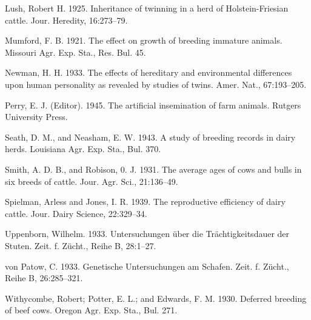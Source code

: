 \begin{hangparas}{0.5in}{1}
Lush, Robert H. 1925. Inheritance of twinning in a herd of Holstein-Friesian cattle.
Jour. Heredity, 16:273--79.

Mumford, F. B. 1921. The effect on growth of breeding immature animals. Missouri
Agr. Exp. Sta., Res. Bul. 45.

Newman, H. H. 1933. The effects of hereditary and environmental differences upon
human personality as revealed by studies of twins. Amer. Nat., 67:193--205.

Perry, E. J. (Editor). 1945. The artificial insemination of farm animals. Rutgers
University Press.

Seath, D. M., and Neasham, E. W. 1943. A study of breeding records in dairy herds.
Louisiana Agr. Exp. Sta., Bul. 370.

Smith, A. D. B., and Robison, 0. J. 1931. The average ages of cows and bulls in
six breeds of cattle. Jour. Agr. Sci., 21:136--49.

Spielman, Arless and Jones, I. R. 1939. The reproductive efficiency of dairy cattle.
Jour. Dairy Science, 22:329--34.

Uppenborn, Wilhelm. 1933. Untersuchungen \"uber die Tr\"achtigkeitsdauer der
Stuten. Zeit. f. Z\"ucht., Reihe B, 28:1--27.

von Patow, C. 1933. Genetische Untersuchungen am Schafen. Zeit. f. Z\"ucht., Reihe
B, 26:285--321.

Withycombe, Robert; Potter, E. L.; and Edwards, F. M. 1930. Deferred breeding of
beef cows. Oregon Agr. Exp. Sta., Bul. 271.
\end{hangparas}